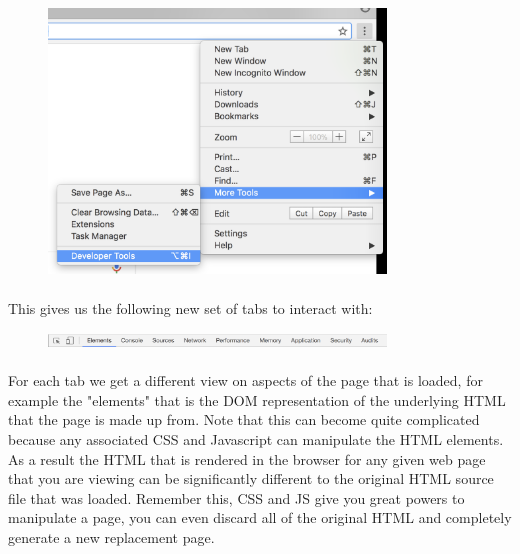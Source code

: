 \documentclass[12pt, a4paper, oneside]{book}
\begin{document}
\begin{figure}[H]
\centering
\includegraphics[width=0.8\textwidth]{figures/devtools.png}
\label{fig:devtools}
\end{figure}


\paragraph{} This gives us the following new set of tabs to interact with:

\begin{figure}[H]
\centering
\includegraphics[width=0.8\textwidth]{figures/devtools_toolbar.png}
\label{fig:devtools_toolbar}
\end{figure}


\paragraph{} For each tab we get a different view on aspects of the page that is loaded, for example the "elements" that is the DOM representation of the underlying HTML that the page is made up from. Note that this can become quite complicated because any associated CSS and Javascript can manipulate the HTML elements. As a result the HTML that is rendered in the browser for any given web page that you are viewing can be significantly different to the original HTML source file that was loaded. Remember this, CSS and JS give you great powers to manipulate a page, you can even discard all of the original HTML and completely generate a new replacement page.
\end{document}
